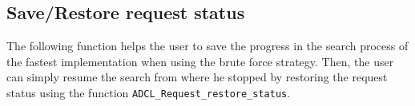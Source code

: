 %    

\subsection{Save/Restore request status}
The following function helps the user to save the progress in the search process of the fastest implementation when using the brute force strategy. Then, the user can simply resume the search from where he stopped by restoring the request status using the function {\tt ADCL\_Request\_restore\_status}.


